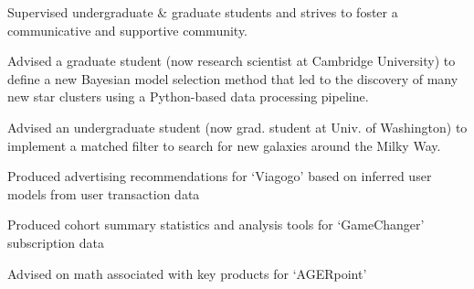 \documentclass[letterpaper,12pt]{deedy-resume} %
\begin{document}
\begin{minipage}[t]{0.64\textwidth}
\begin{tightitemize}
    \item Supervised undergraduate \& graduate students and strives to foster a communicative and supportive community.
    \item Advised a graduate student (now research scientist at Cambridge University) to define a new Bayesian model selection method that led to the discovery of many new star clusters using a Python-based data processing pipeline.
    \item Advised an undergraduate student (now grad. student at Univ. of Washington) to implement a matched filter to search for new galaxies around the Milky Way.
\end{tightitemize}

\sectionspace %



\begin{tightitemize}
    \item Produced advertising recommendations for `Viagogo' based on inferred user models from user transaction data
    \item Produced cohort summary statistics and analysis tools for `GameChanger' subscription data
    \item Advised on math associated with key products for `AGERpoint'
\end{tightitemize}

\sectionspace %



\end{minipage}
\end{document}
